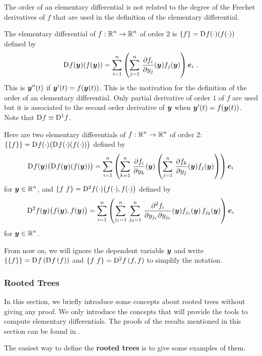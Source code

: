 The order of an elementary differential is not related to the degree
of the Frechet derivatives of $f$ that are used in the definition of the
elementary differential.

\begin{egg}
The elementary differential of $\DS f:\RR^n \to \RR^n$ of order $2$ is
$\{f\} = \fdiff{f}{}(\cdot) (f(\cdot))$ defined by
\[
\fdiff{f}{}(\VEC{y})( f(\VEC{y})) =
\sum_{i=1}^n \left(\sum_{j=1}^n\,
\pdydx{f_i}{y_j}(\VEC{y}) f_j(\VEC{y}) \right) \VEC{e}_i \ .
\]
This is $\VEC{y}''(t)$ if $\VEC{y}'(t) = f(\VEC{y}(t))$.  This is the
motivation for the definition of the order of an elementary
differential.  Only partial derivative of order $1$ of $f$ are used
but it is associated to the second order derivative of $\VEC{y}$ when
$\VEC{y}'(t) = f(\VEC{y}(t))$.  Note that $\fdiff{f}{} \equiv \fdiff{f}{1}$.

Here are two elementary differentials of
$\DS f:\RR^n \to \RR^n$ of order $2$:\\
$\{\{f\}\} = \fdiff{f}{}(\cdot)\big( \fdiff{f}{}(\cdot) (f(\cdot)) \big)$
defined by
\[
\fdiff{f}{}(\VEC{y})\big( \fdiff{f}{}(\VEC{y}) (f(\VEC{y})) \big)
= \sum_{i=1}^n \left(  \sum_{k=1}^n\,
\pdydx{f_i}{y_k}(\VEC{y}) \left(\sum_{j=1}^n\,
\pdydx{f_k}{y_j}(\VEC{y}) f_j(\VEC{y}) \right) \right) \VEC{e}_i
\]
for $\DS \VEC{y} \in \RR^n$, and
$\{f \ f \} = \fdiff{f}{2}(\cdot)\big( f(\cdot) , f(\cdot) \big)$
defined by
\[
\fdiff{f}{2}(\VEC{y})\big( f(\VEC{y}), f(\VEC{y}) \big)
= \sum_{i=1}^n \left(  \sum_{j_1=1}^n\,\sum_{j_2=1}^n\,
\pdydxnm{f_i}{y_{j_1}}{y_{j_1}}{2}{}{}(\VEC{y}) f_{j_1}(\VEC{y})\,
f_{j_2}(\VEC{y}) \right) \VEC{e}_i
\]
for $\DS \VEC{y} \in \RR^n$.

From now on, we will ignore the dependent variable $\VEC{y}$ and write
$\{\{f\}\} = \fdiff{f}{}\,(\fdiff{f}{}\,(f))$ and
$\{f \ f\} = \fdiff{f}{2}\,(f,f)$ to simplify the notation.
\end{egg}

\subsubsection{Rooted Trees}\label{TreeSSSection}

In this section, we briefly introduce some concepts about rooted trees
without giving any proof.  We only introduce the concepts that will
provide the tools to compute elementary differentials.  The proofs of
the results mentioned in this section can be found in \cite{La}.

The easiest way to define the {\bfseries rooted trees}
is to give some examples of them. 

